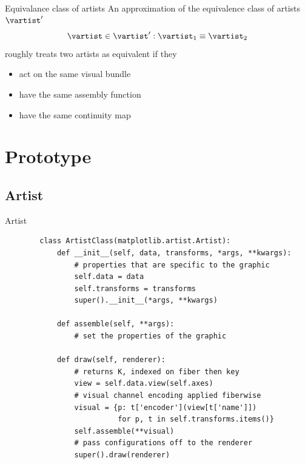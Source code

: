 \documentclass[xcolor={dvipsnames}, handout]{beamer}
\begin{document}
\begin{frame}{Equivalance class of artists}
    An approximation of the equivalence class of artists $\vartist^{\prime}$
    \begin{equation}
    \vartist \in \vartist^{\prime}: \vartist_{1} \equiv \vartist_{2}
    \end{equation}
    roughly treats two artists as equivalent if they 
    \begin{itemize}
        \item act on the same visual bundle \vtotal
        \item have the same assembly function \vmark 
        \item have the same continuity map \vindex 
    \end{itemize}
\end{frame}


\section{Prototype}
\subsection{Artist}
\begin{frame}[fragile]{Artist}
    \begin{verbatim}
        class ArtistClass(matplotlib.artist.Artist):
            def __init__(self, data, transforms, *args, **kwargs):
                # properties that are specific to the graphic
                self.data = data 
                self.transforms = transforms
                super().__init__(*args, **kwargs)
        
            def assemble(self, **args):
                # set the properties of the graphic
        
            def draw(self, renderer):
                # returns K, indexed on fiber then key 
                view = self.data.view(self.axes) 
                # visual channel encoding applied fiberwise 
                visual = {p: t['encoder'](view[t['name']])
                          for p, t in self.transforms.items()}
                self.assemble(**visual)
                # pass configurations off to the renderer
                super().draw(renderer)
        \end{verbatim}
\end{frame}
\end{document}
